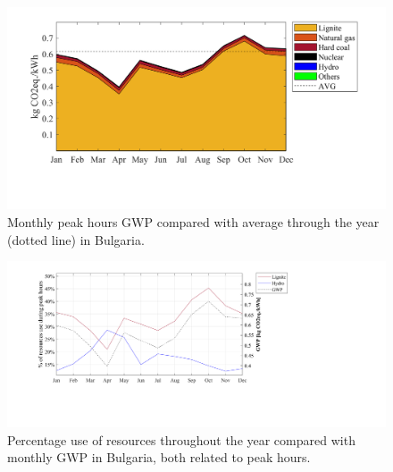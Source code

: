 {\begin{figure}[]
	\centering
	\includegraphics[width=1\textwidth]{ChapterLCA/Images/GWP_plots/Bulgaria_GWP.png}
   \vspace*{-15mm}
\hspace*{-1cm}	\caption{Monthly peak hours GWP compared with average through the year (dotted line) in Bulgaria.}
	\label{GWP_BG}
\end{figure} 
	\vspace*{-7mm}
\begin{figure}[]
	\centering
	\hspace*{0.2cm}\includegraphics[width=1.2\textwidth]{ChapterLCA/Images/GWP_plots/Comp_GWP_BG.png}
	\vspace*{-20mm}
\hspace*{-1cm}	\caption{Percentage use of resources throughout the year compared with monthly GWP in Bulgaria, both related to peak hours.}
	\label{COMP_BG}
\end{figure}






}

